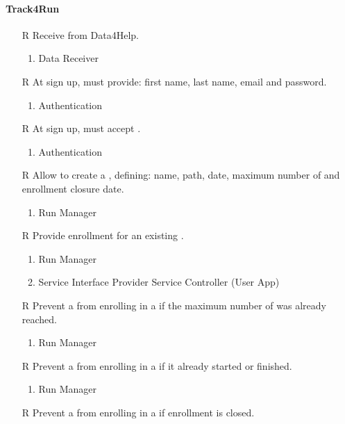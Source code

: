 \paragraph{Track4Run}
\begin{itemize}
	\item[R\subs{40}]Receive  from Data4Help.
	\begin{enumerate}
		\item Data Receiver
	\end{enumerate}
	\item[R\subs{41}]At sign up,  must provide: first name, last name, email and password.
	\begin{enumerate}
		\item Authentication
	\end{enumerate}
	\item[R\subs{42}]At sign up,  must accept .
	\begin{enumerate}
		\item Authentication
	\end{enumerate}
	\item[R\subs{43}]Allow  to create a , defining: name, path, date, maximum number of  and enrollment closure date.
	\begin{enumerate}
		\item Run Manager
	\end{enumerate}
	\item[R\subs{44}]Provide  enrollment for an existing .
	\begin{enumerate}
		\item Run Manager
		\item Service Interface Provider
		\ietm Service Controller (User App)
	\end{enumerate}
	\item[R\subs{45}]Prevent a  from enrolling in a  if the maximum number of  was already reached.
	\begin{enumerate}
		\item Run Manager
	\end{enumerate}
	\item[R\subs{46}]Prevent a  from enrolling in a  if it already started or finished.
	\begin{enumerate}
		\item Run Manager
	\end{enumerate}
	\item[R\subs{47}]Prevent a  from enrolling in a  if enrollment is closed.

\end{itemize}
